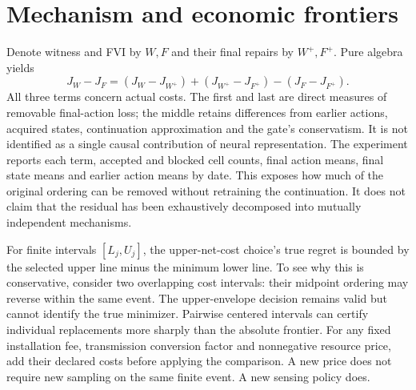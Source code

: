 \section{Mechanism and economic frontiers}\label{supp:mechanism50}
Denote witness and FVI by $W,F$ and their final repairs by $W^+,F^+$. Pure algebra yields
\begin{equation}\label{eq:decomposition50}
 J_W-J_F=(J_W-J_{W^+})+(J_{W^+}-J_{F^+})-(J_F-J_{F^+}).
\end{equation}
All three terms concern actual costs. The first and last are direct measures of removable final-action loss; the middle retains differences from earlier actions, acquired states, continuation approximation and the gate's conservatism. It is not identified as a single causal contribution of neural representation. The experiment reports each term, accepted and blocked cell counts, final action means, final state means and earlier action means by date. This exposes how much of the original ordering can be removed without retraining the continuation. It does not claim that the residual has been exhaustively decomposed into mutually independent mechanisms.

For finite intervals $[L_j,U_j]$, the upper-net-cost choice's true regret is bounded by the selected upper line minus the minimum lower line. To see why this is conservative, consider two overlapping cost intervals: their midpoint ordering may reverse within the same event. The upper-envelope decision remains valid but cannot identify the true minimizer. Pairwise centered intervals can certify individual replacements more sharply than the absolute frontier. For any fixed installation fee, transmission conversion factor and nonnegative resource price, add their declared costs before applying the comparison. A new price does not require new sampling on the same finite event. A new sensing policy does.
